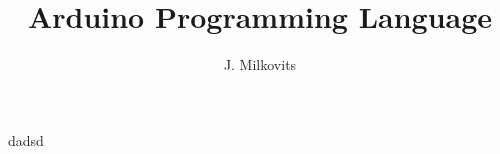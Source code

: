 \documentclass[11pt,a4paper]{article}
\author{J. Milkovits}
\title{Arduino Programming Language}
\date{}
\begin{document}
\maketitle

dadsd
\end{document}
